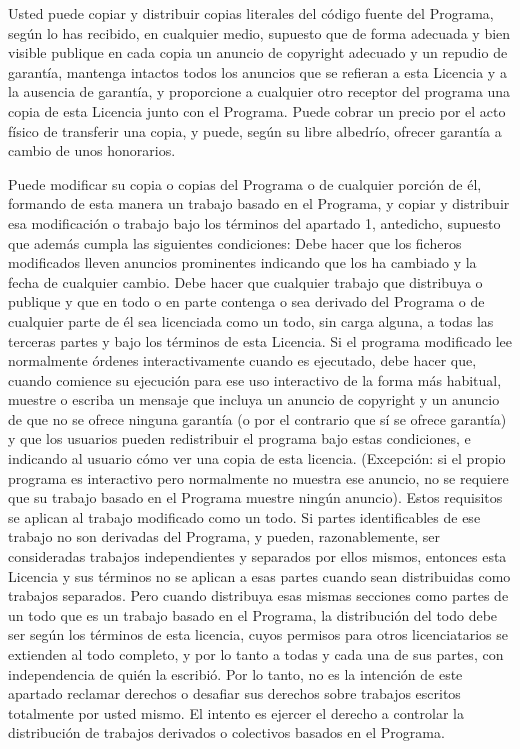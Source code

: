 Usted puede copiar y distribuir copias literales del código fuente del Programa, según lo has recibido, en cualquier medio, supuesto que de forma adecuada y bien visible publique en cada copia un anuncio de copyright adecuado y un repudio de garantía, mantenga intactos todos los anuncios que se refieran a esta Licencia y a la ausencia de garantía, y proporcione a cualquier otro receptor del programa una copia de esta Licencia junto con el Programa.
Puede cobrar un precio por el acto físico de transferir una copia, y puede, según su libre albedrío, ofrecer garantía a cambio de unos honorarios.

Puede modificar su copia o copias del Programa o de cualquier porción de él, formando de esta manera un trabajo basado en el Programa, y copiar y distribuir esa modificación o trabajo bajo los términos del apartado 1, antedicho, supuesto que además cumpla las siguientes condiciones:
Debe hacer que los ficheros modificados lleven anuncios prominentes indicando que los ha cambiado y la fecha de cualquier cambio.
Debe hacer que cualquier trabajo que distribuya o publique y que en todo o en parte contenga o sea derivado del Programa o de cualquier parte de él sea licenciada como un todo, sin carga alguna, a todas las terceras partes y bajo los términos de esta Licencia.
Si el programa modificado lee normalmente órdenes interactivamente cuando es ejecutado, debe hacer que, cuando comience su ejecución para ese uso interactivo de la forma más habitual, muestre o escriba un mensaje que incluya un anuncio de copyright y un anuncio de que no se ofrece ninguna garantía (o por el contrario que sí se ofrece garantía) y que los usuarios pueden redistribuir el programa bajo estas condiciones, e indicando al usuario cómo ver una copia de esta licencia. (Excepción: si el propio programa es interactivo pero normalmente no muestra ese anuncio, no se requiere que su trabajo basado en el Programa muestre ningún anuncio).
Estos requisitos se aplican al trabajo modificado como un todo. Si partes identificables de ese trabajo no son derivadas del Programa, y pueden, razonablemente, ser consideradas trabajos independientes y separados por ellos mismos, entonces esta Licencia y sus términos no se aplican a esas partes cuando sean distribuidas como trabajos separados. Pero cuando distribuya esas mismas secciones como partes de un todo que es un trabajo basado en el Programa, la distribución del todo debe ser según los términos de esta licencia, cuyos permisos para otros licenciatarios se extienden al todo completo, y por lo tanto a todas y cada una de sus partes, con independencia de quién la escribió.
Por lo tanto, no es la intención de este apartado reclamar derechos o desafiar sus derechos sobre trabajos escritos totalmente por usted mismo. El intento es ejercer el derecho a controlar la distribución de trabajos derivados o colectivos basados en el Programa.

